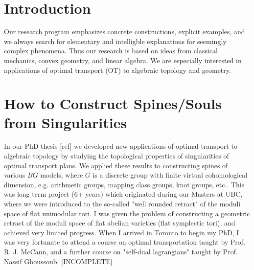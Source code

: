 \documentclass[12pt]{amsart}
\theoremstyle{definition}
\theoremstyle{remark}
\begin{document}
\title{}


\author{J. H. Martel}
\date{\today}
\maketitle

\begin{abstract}

\end{abstract}

\tableofcontents

\section{Introduction}

Our research program emphasizes concrete constructions, explicit examples, and we always search for elementary and intelligble explanations for seemingly complex phenomena. Thus our research is based on ideas from classical mechanics, convex geometry, and linear algebra. We are especially interested in applications of optimal transport (OT) to algebraic topology and geometry. 


\section{How to Construct Spines/Souls from Singularities}
In our PhD thesis [ref] we developed new applications of optimal transport to algebraic topology by studying the topological properties of singularities of optimal transport plans. We applied these results to constructing spines of various $BG$ models, where $G$ is a discrete group with finite virtual cohomological dimension, e.g. arithmetic groups, mapping class groups, knot groups, etc.. This was long term project (6+ years) which originated during our Masters at UBC, where we were introduced to the so-called "well rounded retract" of the moduli space of flat unimodular tori. I was given the problem of constructing a geometric retract of the moduli space of flat abelian varieties (flat symplectic tori), and achieved very limited progress. When I arrived in Toronto to begin my PhD, I was very fortunate to attend a course on optimal transportation taught by Prof. R. J. McCann, and a further course on "self-dual lagrangians" taught by Prof. Nassif Ghoussoub.  [INCOMPLETE]
\end{document}
